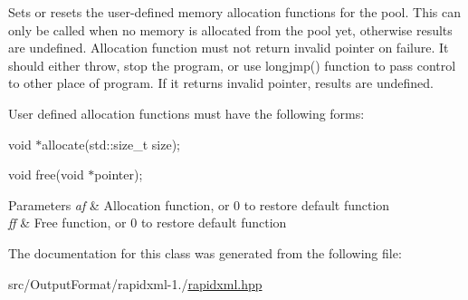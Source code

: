 Sets or resets the user-\/defined memory allocation functions for the pool. This can only be called when no memory is allocated from the pool yet, otherwise results are undefined. Allocation function must not return invalid pointer on failure. It should either throw, stop the program, or use {\ttfamily longjmp()} function to pass control to other place of program. If it returns invalid pointer, results are undefined. \par
\par
 User defined allocation functions must have the following forms\-: \par
{\ttfamily  \par
void $\ast$allocate(std\-::size\-\_\-t size); \par
void free(void $\ast$pointer); }\par
 
\begin{DoxyParams}{Parameters}
{\em af} & Allocation function, or 0 to restore default function \\
\hline
{\em ff} & Free function, or 0 to restore default function \\
\hline
\end{DoxyParams}


The documentation for this class was generated from the following file\-:\begin{DoxyCompactItemize}
\item 
src/\-Output\-Format/rapidxml-\/1./\hyperlink{rapidxml_8hpp}{rapidxml.\-hpp}\end{DoxyCompactItemize}
